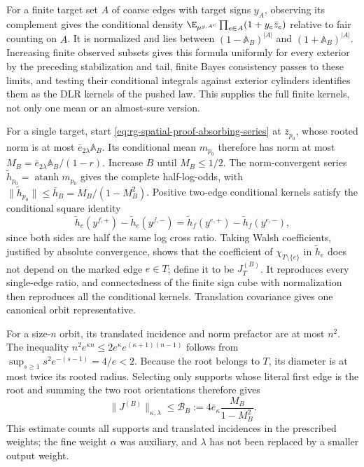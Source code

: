For a finite target set \(A\) of coarse edges with target signs \(y_A\),
observing its complement gives the conditional density
\(\E_{\mu^{y,A^c}}\prod_{e\in A}(1+y_e\bar z_e)\) relative to fair counting
on \(A\). It is normalized and lies between \((1-\mathbb A_B)^{|A|}\) and
\((1+\mathbb A_B)^{|A|}\). Increasing finite observed subsets gives this
formula uniformly for every exterior by the preceding stabilization and
tail, finite Bayes consistency passes to these limits, and testing their
conditional integrals against exterior cylinders identifies them as the DLR
kernels of the pushed law. This supplies the full finite kernels, not only
one mean or an almost-sure version.

For a single target, start \cref{eq:rg-spatial-proof-absorbing-series} at
\(\bar z_{p_0}\), whose rooted norm is at most
\(\bar e_{2\lambda}\mathbb A_B\). Its conditional mean \(m_{p_0}\)
therefore has norm at most \(M_B=\bar e_{2\lambda}\mathbb A_B/(1-r)\).
Increase \(B\) until \(M_B\le1/2\). The norm-convergent series
\(\widetilde h_{p_0}=\operatorname{atanh}m_{p_0}\) gives the complete
half-log-odds, with \(\|\widetilde h_{p_0}\|\le\bar h_B=M_B/(1-M_B^2)\).
Positive two-edge conditional kernels satisfy the conditional square
identity
\begin{equation}
 \widetilde h_e(y^{f,+})-\widetilde h_e(y^{f,-})
 =\widetilde h_f(y^{e,+})-\widetilde h_f(y^{e,-}),
 \label{eq:rg-spatial-proof-conditional-square}
\end{equation}
since both sides are half the same log cross ratio. Taking Walsh
coefficients, justified by absolute convergence, shows that the coefficient
of \(\chi_{T\setminus\{e\}}\) in \(\widetilde h_e\) does not depend on the
marked edge \(e\in T\); define it to be \(J_T^{(B)}\). It reproduces every
single-edge ratio, and connectedness of the finite sign cube with
normalization then reproduces all the conditional kernels. Translation
covariance gives one canonical orbit representative.

For a size-\(n\) orbit, its translated incidence and norm prefactor are at
most \(n^2\). The inequality \(n^2e^{\kappa n}\le2e^\kappa
e^{(\kappa+1)(n-1)}\) follows from \(\sup_{s\ge1}s^2e^{-(s-1)}=4/e<2\).
Because the root belongs to \(T\), its diameter is at most twice its rooted
radius. Selecting only supports whose literal first edge is the root and
summing the two root orientations therefore gives
\begin{equation}
 \|J^{(B)}\|_{\kappa,\lambda}
 \le\mathcal B_B:=4\bar e_\kappa\frac{M_B}{1-M_B^2}.
 \label{eq:rg-spatial-proof-basin-norm}
\end{equation}
This estimate counts all supports and translated incidences in the
prescribed weights; the fine weight \(\alpha\) was auxiliary, and
\(\lambda\) has not been replaced by a smaller output weight.

